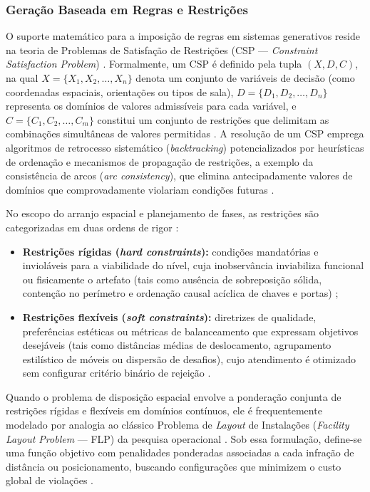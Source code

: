 \subsubsection{Geração Baseada em Regras e Restrições}
\label{sec:geracao_restricoes}

O suporte matemático para a imposição de regras em sistemas generativos reside na teoria de Problemas de Satisfação de Restrições (CSP --- \textit{Constraint Satisfaction Problem}) \cite{russell2021artificial}. Formalmente, um CSP é definido pela tupla $(X, D, C)$, na qual $X = \{X_1, X_2, \dots, X_n\}$ denota um conjunto de variáveis de decisão (como coordenadas espaciais, orientações ou tipos de sala), $D = \{D_1, D_2, \dots, D_n\}$ representa os domínios de valores admissíveis para cada variável, e $C = \{C_1, C_2, \dots, C_m\}$ constitui um conjunto de restrições que delimitam as combinações simultâneas de valores permitidas \cite{russell2021artificial}. A resolução de um CSP emprega algoritmos de retrocesso sistemático (\textit{backtracking}) potencializados por heurísticas de ordenação e mecanismos de propagação de restrições, a exemplo da consistência de arcos (\textit{arc consistency}), que elimina antecipadamente valores de domínios que comprovadamente violariam condições futuras \cite{russell2021artificial}.

No escopo do arranjo espacial e planejamento de fases, as restrições são categorizadas em duas ordens de rigor \cite{tanagra, xu2025constraint, xu2025databasedrivenframework3dlevel}:
\begin{itemize}
    \item \textbf{Restrições rígidas (\textit{hard constraints}):} condições mandatórias e invioláveis para a viabilidade do nível, cuja inobservância inviabiliza funcional ou fisicamente o artefato (tais como ausência de sobreposição sólida, contenção no perímetro e ordenação causal acíclica de chaves e portas) \cite{tanagra, sun2024roomplanner, xu2025constraint};
    \item \textbf{Restrições flexíveis (\textit{soft constraints}):} diretrizes de qualidade, preferências estéticas ou métricas de balanceamento que expressam objetivos desejáveis (tais como distâncias médias de deslocamento, agrupamento estilístico de móveis ou dispersão de desafios), cujo atendimento é otimizado sem configurar critério binário de rejeição \cite{xu2025constraint, xu2025databasedrivenframework3dlevel}.
\end{itemize}

Quando o problema de disposição espacial envolve a ponderação conjunta de restrições rígidas e flexíveis em domínios contínuos, ele é frequentemente modelado por analogia ao clássico Problema de \textit{Layout} de Instalações (\textit{Facility Layout Problem} --- FLP) da pesquisa operacional \cite{xu2025constraint, xu2025databasedrivenframework3dlevel}. Sob essa formulação, define-se uma função objetivo com penalidades ponderadas associadas a cada infração de distância ou posicionamento, buscando configurações que minimizem o custo global de violações \cite{xu2025constraint}.

